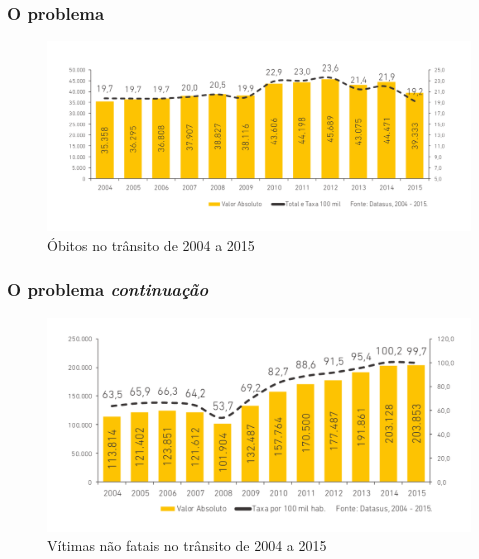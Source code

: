\begin{frame}
	\frametitle{O problema}
	\begin{figure}[h]
		\caption{Óbitos no trânsito de 2004 a 2015}
		\centering
		\includegraphics[width=1\textwidth]{imagens/obto}
	\end{figure}
\end{frame}

\begin{frame}
	\frametitle{O problema \textit{continuação}}
	\begin{figure}[h]
		\caption{Vítimas não fatais no trânsito de 2004 a 2015}
		\centering
		\includegraphics[width=1\textwidth]{imagens/ferido}
	\end{figure}
\end{frame}


